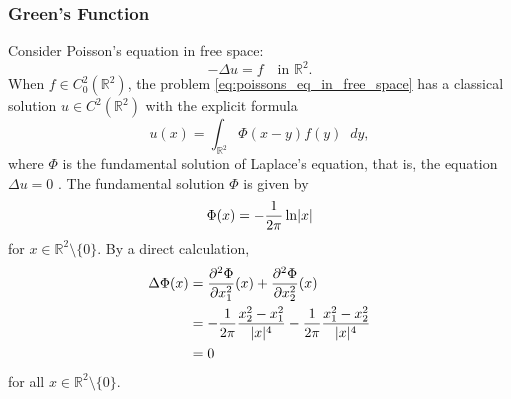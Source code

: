 \documentclass[english, 12pt, a4paper, sci, utf8, a-2b, online]{aaltothesis}
\theoremstyle{definition}
\theoremstyle{plain}
\DeclarePairedDelimiter\abs{\lvert}{\rvert}
\newcommand*\diff{\mathop{}\!d}
\numberwithin{equation}{section}
\begin{document}
\subsubsection{Green's Function}
\label{subsubsec:greens_function}

Consider Poisson's equation in free space:
\begin{equation}
    \label{eq:poissons_eq_in_free_space}
    -\Delta u = f \quad \text{in } \mathbb{R}^2.
\end{equation}
When $f \in C_0^2(\mathbb{R}^2)$, the problem \eqref{eq:poissons_eq_in_free_space} has
a classical solution $u \in C^2(\mathbb{R}^2)$ with the explicit formula
\begin{equation*}
    u(x) = \int_{\mathbb{R}^2} \Phi(x-y) f(y) \diff y,
\end{equation*}
where $\Phi$ is the fundamental solution of Laplace's equation, that is,
the equation $\Delta u = 0$ \cite[Theorem~1 on p.~23]{evans2010}.
The fundamental solution $\Phi$ is given by
\begin{equation*}
    \Phi(x) = -\frac{1}{2 \pi} \ln \abs{x}
\end{equation*}
for $x \in \mathbb{R}^2 \setminus \{ 0 \}$.
By a direct calculation,
\begin{align*}
    \Delta \Phi(x)
    &= \frac{\partial^2 \Phi}{\partial x_1^2}(x)
        + \frac{\partial^2 \Phi}{\partial x_2^2}(x) \\
    &= -\frac{1}{2\pi} \frac{x_2^2 - x_1^2}{\abs{x}^4}
        -\frac{1}{2\pi} \frac{x_1^2 - x_2^2}{\abs{x}^4} \\
    &= 0
\end{align*}
for all $x \in \mathbb{R}^2 \setminus \{ 0 \}$.
\end{document}
